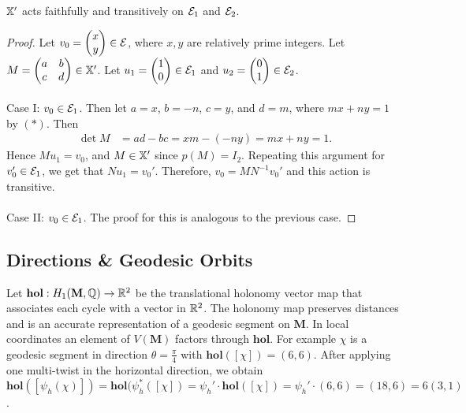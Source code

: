 \documentclass[a4paper, 11pt]{article}
\def\hol{\mathbf{hol}}
\def\bM{\mathbf{M}}
\begin{document}
\begin{lem}
$\mathbb{X}'$ acts faithfully and transitively on $\mathcal{E}_1$ and $\mathcal{E}_2$.
\begin{proof}
Let $v_0=\begin{pmatrix}x \\ y\end{pmatrix}\in\mathcal{E}$, where $x,y$ are relatively prime integers. Let $M=\begin{pmatrix}a & b \\ c & d
\end{pmatrix}\in\mathbb{X}'$. Let $u_1=\begin{pmatrix}1 \\ 0 \end{pmatrix}\in\mathcal{E}_1$ and $u_2=\begin{pmatrix}0 \\ 1 \end{pmatrix}\in\mathcal{E}_2$.\\\\
Case I: $v_0\in \mathcal{E}_1$. Then let $a=x$, $b=-n$, $c=y$, and $d=m$, where $mx+ny=1$ by $(*)$.  Then
\begin{align*}
\det M &= ad-bc=xm-(-ny)=mx+ny=1.
\end{align*}
Hence $Mu_1=v_0$, and $M\in\mathbb{X}'$ since $p(M)=I_2$. Repeating this argument for $v_0'\in \mathcal{E}_1$, we get that $Nu_1=v_0'$. Therefore, $v_0=MN^{-1}v_0'$ and this action is transitive.\\\\
Case II: $v_0\in \mathcal{E}_1$. The proof for this is analogous to the previous case.
\end{proof}
\end{lem}

\subsection{Directions \& Geodesic Orbits}
Let $\hol:H_1(\bM,\QQ)\rightarrow\RR^2$ be the translational holonomy vector map that associates each cycle with a vector in $\mathbb{R}^2$. The holonomy map preserves distances and is an accurate representation of a geodesic segment on $\bM$. In local coordinates an element of $V(\bM)$ factors through $\hol$. For example $\chi$ is a geodesic segment in direction $\theta=\frac{\pi}{4}$ with $\hol([\chi])=(6,6)$. After applying one multi-twist in the horizontal direction, we obtain $\hol([\psi_h(\chi)])=\hol(\psi_h^*([\chi])=\psi_h'\cdot\hol([\chi])=\psi_h'\cdot(6,6)=(18,6)=6(3,1)$. 
\end{document}
